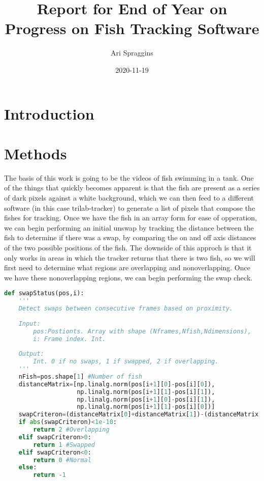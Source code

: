 \documentclass[12pt]{article}
\title{Report for End of Year on Progress on Fish Tracking Software}
\author{Ari Spraggins}
\date{2020-11-19}
\begin{document}
\maketitle
{}

\section{Introduction}


\section{Methods}

The basis of this work is going to be the videos of fish swimming in a tank. One of the things that quickly becomes apparent is that the fish are present as a series of dark pixels against a white background, which we can then feed to a different software (in this case trilab-tracker) to generate a list of pixels that compose the fishes for tracking. Once we have the fish in an array form for ease of opperation, we can begin performing an initial unswap by tracking the distance between the fish to determine if there was a swap, by comparing the on and off axis distances of the two possible positions of the fish. The downside of this approch is that it only works in areas in which the tracker returns that there is two fish, so we will first need to determine what regions are overlapping and nonoverlapping. Once we have these nonoverlapping regions, we can begin performing the swap check.

\begin{minipage}[c]{\textwidth}
\begin{lstlisting}[language=Python]
def swapStatus(pos,i):
    '''
    Detect swaps between consecutive frames based on proximity.
    
    Input:
        pos:Postionts. Array with shape (Nframes,Nfish,Ndimensions),
        i: Frame index. Int.
    
    Output:
        Int. 0 if no swaps, 1 if swapped, 2 if overlapping.
    '''
    nFish=pos.shape[1] #Number of fish
    distanceMatrix=[np.linalg.norm(pos[i+1][0]-pos[i][0]),
                    np.linalg.norm(pos[i+1][1]-pos[i][1]),
                    np.linalg.norm(pos[i+1][0]-pos[i][1]),
                    np.linalg.norm(pos[i+1][1]-pos[i][0])]
    swapCriteron=(distanceMatrix[0]+distanceMatrix[1])-(distanceMatrix[2]+distanceMatrix[3])
    if abs(swapCriteron)<1e-10:
        return 2 #Overlapping
    elif swapCriteron>0:
        return 1 #Swapped
    elif swapCriteron<0:
        return 0 #Normal
    else:
        return -1
\end{lstlisting}
\end{minipage}
\end{document}
